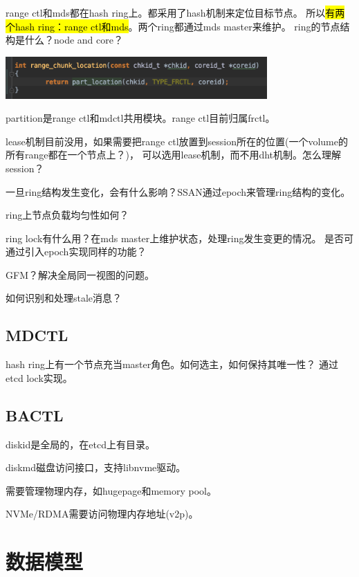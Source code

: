 range ctl和mds都在hash ring上。都采用了hash机制来定位目标节点。
所以\hl{有两个hash ring：range ctl和mds}。两个ring都通过mds master来维护。
ring的节点结构是什么？node and core？
\begin{center}
\includegraphics[width=10cm]{../imgs/chunk-location.png}
\end{center}

partition是range ctl和mdctl共用模块。range ctl目前归属frctl。

lease机制目前没用，如果需要把range ctl放置到session所在的位置(一个volume的所有range都在一个节点上？)，
可以选用lease机制，而不用dht机制。怎么理解session？

一旦ring结构发生变化，会有什么影响？SSAN通过epoch来管理ring结构的变化。

ring上节点负载均匀性如何？

ring lock有什么用？在mds master上维护状态，处理ring发生变更的情况。
是否可通过引入epoch实现同样的功能？

GFM？解决全局同一视图的问题。

如何识别和处理stale消息？

\subsection{MDCTL}

hash ring上有一个节点充当master角色。如何选主，如何保持其唯一性？
通过etcd lock实现。

\subsection{BACTL}


diskid是全局的，在etcd上有目录。

diskmd磁盘访问接口，支持libnvme驱动。

需要管理物理内存，如hugepage和memory pool。

NVMe/RDMA需要访问物理内存地址(v2p)。

\section{数据模型}


